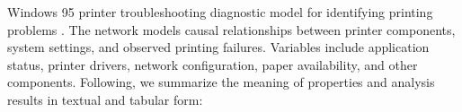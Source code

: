 Windows 95 printer troubleshooting diagnostic model for identifying printing problems \cite{heckerman1995}. The network models causal relationships between printer components, system settings, and observed printing failures. Variables include application status, printer drivers, network configuration, paper availability, and other components. Following, we summarize the meaning of properties and analysis results in textual and tabular form:
